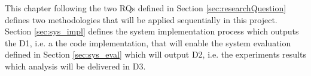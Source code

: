 This chapter following the two \glspl{RQ} defined in Section \ref{sec:researchQuestion} defines two methodologies that will be applied sequentially in this project. Section \ref{sec:sys_impl} defines the system implementation process which outputs the D1, i.e. a the code implementation, that will enable the system evaluation defined in Section \ref{sec:sys_eval} which will output D2, i.e. the experiments results which analysis will be delivered in D3.
